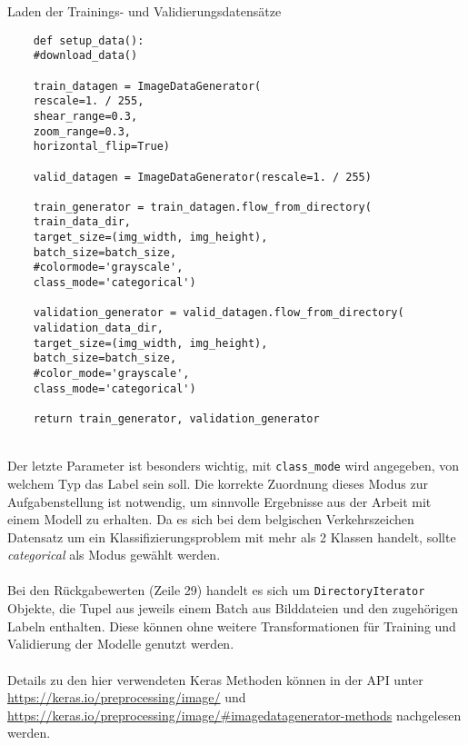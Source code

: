 \begin{listing} [ht]
	\caption{Laden der Trainings- und Validierungsdatensätze}
	\label{lst:load-data}
	\begin{verbatim}
	def setup_data():
	#download_data()
	
	train_datagen = ImageDataGenerator(
	rescale=1. / 255,
	shear_range=0.3,
	zoom_range=0.3,
	horizontal_flip=True)
	
	valid_datagen = ImageDataGenerator(rescale=1. / 255)
	
	train_generator = train_datagen.flow_from_directory(
	train_data_dir,
	target_size=(img_width, img_height),
	batch_size=batch_size,
	#colormode='grayscale',
	class_mode='categorical')
	
	validation_generator = valid_datagen.flow_from_directory(
	validation_data_dir,
	target_size=(img_width, img_height),
	batch_size=batch_size,
	#color_mode='grayscale',
	class_mode='categorical')
	
	return train_generator, validation_generator
	\end{verbatim}
\end{listing} \ \\
%
Der letzte Parameter ist besonders wichtig, mit \texttt{class\_mode} wird angegeben, von welchem Typ das Label sein soll. Die korrekte Zuordnung dieses Modus zur Aufgabenstellung ist notwendig, um sinnvolle Ergebnisse aus der Arbeit mit einem Modell zu erhalten. Da es sich bei dem belgischen Verkehrszeichen Datensatz um ein Klassifizierungsproblem mit mehr als 2 Klassen handelt, sollte \textit{categorical} als Modus gewählt werden. \\
\\
Bei den Rückgabewerten (Zeile 29) handelt es sich um \texttt{DirectoryIterator} Objekte, die Tupel aus jeweils einem Batch aus Bilddateien und den zugehörigen Labeln enthalten. Diese können ohne weitere Transformationen für Training und Validierung der Modelle genutzt werden.\\
\\
Details zu den hier verwendeten Keras Methoden können in der API unter \url{https://keras.io/preprocessing/image/} und \url{https://keras.io/preprocessing/image/#imagedatagenerator-methods} nachgelesen werden.

